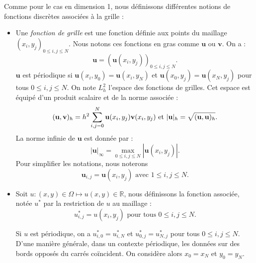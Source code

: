 Comme pour le cas en dimension 1, nous définissons différentes notions de fonctions discrètes associées à la grille :
\begin{itemize}
\item Une \textit{fonction de grille} est une fonction définie aux points du maillage $(x_i,y_j)_{0 \leq i,j \leq N}$. Nous notons ces fonctions en gras comme $\mathbf{u}$ ou $\mathbf{v}$. On a :
\begin{equation}
\mathbf{u} = \left( \mathbf{u}(x_i,y_j) \right)_{0 \leq i,j \leq N}.
\end{equation}
$\mathbf{u}$ est périodique si $\mathbf{u}(x_{i},y_0) = \mathbf{u}(x_{i},y_N)$ et $\mathbf{u}(x_{0},y_j) = \mathbf{u}(x_{N},y_j)$ pour tous $0 \leq i,j \leq N$.
On note $L^2_h$ l'espace des fonctions de grilles. Cet espace est équipé d'un produit scalaire et de la norme associée :
\begin{equation}
(\mathbf{u}, \mathbf{v})_h = h^2 \displaystyle\sum\limits_{i,j=0}^N \mathbf{u}(x_i,y_j) \mathbf{v}(x_i,y_j) \text{ et } |\mathbf{u}|_h = \sqrt{(\mathbf{u},\mathbf{u})_h}.
\end{equation}
La norme infinie de $\mathbf{u}$ est donnée par :
\begin{equation}
| \mathbf{u} |_{\infty} = \max_{0 \leq i,j \leq N} |\mathbf{u}(x_i,y_j)|.
\end{equation}
Pour simplifier les notations, nous noterons
\begin{equation}
\mathbf{u}_{i,j} = \mathbf{u}(x_i, y_j) \text{ avec } 1 \leq i,j \leq N.
\end{equation}

\item Soit $u : (x,y) \in \Omega \mapsto u(x,y) \in \mathbb{R}$, nous définissons la fonction associée, notée $u^*$ par la restriction de $u$ au maillage :
\begin{equation}
u^*_{i,j} = u(x_i, y_j) \text{ pour tous } 0 \leq i,j \leq N.
\end{equation}

Si $u$ est périodique, on a $u^*_{i,0}=u^*_{i,N}$ et $u^*_{0,j}=u^*_{N,j}$ pour tous $0 \leq i,j \leq N$.
D'une manière générale, dans un contexte périodique, les données sur des bords opposés du carrés coïncident. On considère alors $x_0 = x_N$ et $y_0 = y_N$.
\end{itemize}

